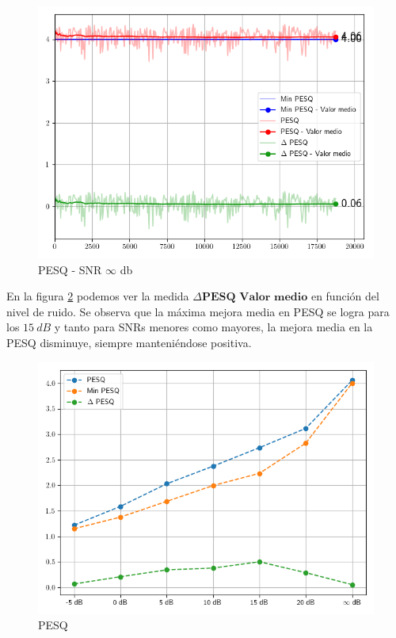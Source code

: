 \begin{figure}[H]
	\centering
	\centerline{\includegraphics[scale=0.70]{images/ch7/objective_metrics/metric_PESQ_infdb.png}}
	\caption{PESQ - SNR $\infty$ db}
	\label{fig:ch7_pesq_inf_db}
\end{figure}

En la figura \ref{fig:ch7_pesq_resume} podemos ver la medida $\Delta \textbf{PESQ Valor medio}$ en función del nivel de ruido. Se observa que la máxima mejora media en PESQ se logra para los $\SI{15}{dB}$ y tanto para SNRs menores como mayores, la mejora media en la PESQ disminuye, siempre manteniéndose positiva.

\begin{figure}
	\centering
	\centerline{\includegraphics[scale=0.70]{images/ch7/objective_metrics/metric_PESQ.png}}
	\caption{PESQ}
	\label{fig:ch7_pesq_resume}
\end{figure}

